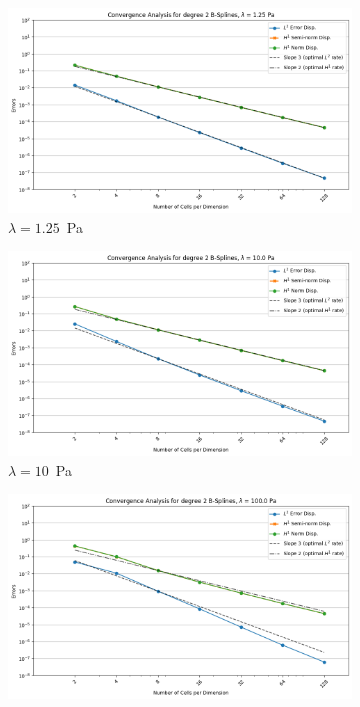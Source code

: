 \documentclass[a4paper,12pt,twoside]{report}
\begin{document}
\begin{figure}
	\centering
	\begin{subfigure}[b]{0.49\textwidth}
		\centering
		\includegraphics[width=\textwidth]{figures/figures_increasing_lambda_non_mixed/convergence_plot_degree_2_lambda=1.25.png}
		\caption{$\lambda=1.25$~Pa}
	\end{subfigure}
	\begin{subfigure}[b]{0.49\textwidth}
		\centering
		\includegraphics[width=\textwidth]{figures/figures_increasing_lambda_non_mixed/convergence_plot_degree_2_lambda=10.0.png}
		\caption{$\lambda=10$~Pa}
	\end{subfigure}
	\centering
	\begin{subfigure}[b]{0.49\textwidth}
		\centering
		\includegraphics[width=\textwidth]{figures/figures_increasing_lambda_non_mixed/convergence_plot_degree_2_lambda=100.0.png}

\end{subfigure}
\end{figure}
\end{document}
